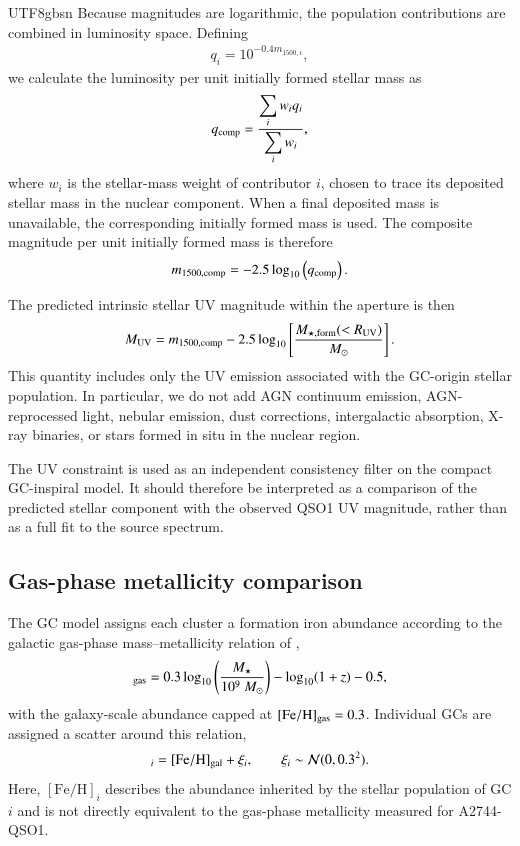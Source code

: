 \documentclass[trackchanges, twocolappendix, twocolumn]{aastex701}
\begin{document}
\begin{CJK*}{UTF8}{gbsn}
Because magnitudes are logarithmic, the population contributions are combined
in luminosity space. Defining
\begin{align}
q_i=10^{-0.4m_{1500,i}},
\end{align}
we calculate the luminosity per unit initially formed stellar mass as
\begin{align}
q_{\rm comp}
 =
 \frac{\displaystyle\sum_i w_i q_i}
      {\displaystyle\sum_i w_i},
\end{align}
where $w_i$ is the stellar-mass weight of contributor $i$, chosen to
trace its deposited stellar mass in the nuclear component. When a final
deposited mass is unavailable, the corresponding initially formed mass is
used. The composite magnitude per unit initially formed mass is therefore
\begin{align}
m_{1500,{\rm comp}}
 =
 -2.5\log_{10}\left(q_{\rm comp}\right).
\end{align}

The predicted intrinsic stellar UV magnitude within the aperture is then
\begin{align}
M_{\rm UV}
 =
 m_{1500,{\rm comp}}
 -
 2.5\log_{10}
 \left[
 \frac{M_{\star,{\rm form}}(<R_{\rm UV})}{M_\odot}
 \right].
\label{eq:muv_model}
\end{align}
This quantity includes only the UV emission associated with the GC-origin
stellar population. In particular, we do not add AGN continuum emission,
AGN-reprocessed light, nebular emission, dust corrections, intergalactic
absorption, X-ray binaries, or stars formed in situ in the nuclear region.

The UV constraint is used as an independent consistency filter on the compact GC-inspiral model. It should therefore be interpreted as a comparison of the predicted stellar component with the observed QSO1 UV magnitude, rather than as a full fit to the source spectrum.

\subsection{Gas-phase metallicity comparison}
\label{subsec:metallicity}

The GC model assigns each cluster a formation iron abundance according to the
galactic gas-phase mass--metallicity relation of \citet{Chen&Gnedin2024aGC},
\begin{align}
[{\rm Fe/H}]_{\rm gas} = 0.3 \log_{10} \left( \dfrac{M_\star}{10^9~M_\odot} \right) - \log_{10} (1 + z) - 0.5 ,
\label{eq:MMR}
\end{align}
with the galaxy-scale abundance capped at $[{\rm Fe/H}]_{\rm gas} = 0.3$. Individual GCs are assigned a scatter around this relation,
\begin{align}
[\mathrm{Fe/H}]_i
 =
 [\mathrm{Fe/H}]_{\rm gal}+\xi_i,
 \qquad
 \xi_i\sim\mathcal{N}(0,0.3^2).
\end{align}
Here, $[\mathrm{Fe/H}]_i$ describes the abundance inherited by the stellar
population of GC $i$ and is not directly equivalent to the gas-phase
metallicity measured for A2744-QSO1.


\end{CJK*}
\end{document}
